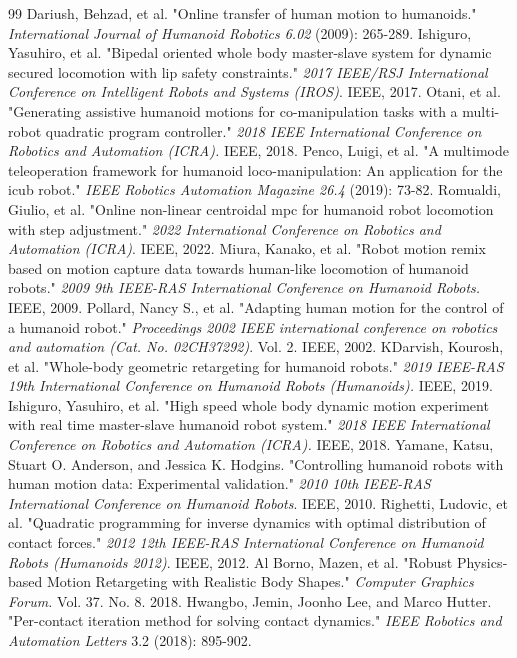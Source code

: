\begin{thebibliography}{99}
 Dariush, Behzad, et al. "Online transfer of human motion to humanoids." \textit{International Journal of Humanoid Robotics 6.02} (2009): 265-289.
Ishiguro, Yasuhiro, et al. "Bipedal oriented whole body master-slave system for dynamic secured locomotion with lip safety constraints." \textit{2017 IEEE/RSJ International Conference on Intelligent Robots and Systems (IROS)}. IEEE, 2017.
 Otani, et al. "Generating assistive humanoid motions for co-manipulation tasks with a multi-robot quadratic program controller." \textit{2018 IEEE International Conference on Robotics and Automation (ICRA).} IEEE, 2018.
 Penco, Luigi, et al. "A multimode teleoperation framework for humanoid loco-manipulation: An application for the icub robot." \textit{IEEE Robotics Automation Magazine 26.4 }(2019): 73-82.
 Romualdi, Giulio, et al. "Online non-linear centroidal mpc for humanoid robot locomotion with step adjustment." \textit{2022 International Conference on Robotics and Automation (ICRA)}. IEEE, 2022.
 Miura, Kanako, et al. "Robot motion remix based on motion capture data towards human-like locomotion of humanoid robots." \textit{2009 9th IEEE-RAS International Conference on Humanoid Robots. }IEEE, 2009. 
 Pollard, Nancy S., et al. "Adapting human motion for the control of a humanoid robot." \textit{Proceedings 2002 IEEE international conference on robotics and automation (Cat. No. 02CH37292)}. Vol. 2. IEEE, 2002.
 KDarvish, Kourosh, et al. "Whole-body geometric retargeting for humanoid robots." \textit{2019 IEEE-RAS 19th International Conference on Humanoid Robots (Humanoids). }IEEE, 2019.
 Ishiguro, Yasuhiro, et al. "High speed whole body dynamic motion experiment with real time master-slave humanoid robot system." \textit{2018 IEEE International Conference on Robotics and Automation (ICRA).} IEEE, 2018.
 Yamane, Katsu, Stuart O. Anderson, and Jessica K. Hodgins. "Controlling humanoid robots with human motion data: Experimental validation." \textit{2010 10th IEEE-RAS International Conference on Humanoid Robots}. IEEE, 2010.
 Righetti, Ludovic, et al. "Quadratic programming for inverse dynamics with optimal distribution of contact forces." \textit{2012 12th IEEE-RAS International Conference on Humanoid Robots (Humanoids 2012)}. IEEE, 2012.
 Al Borno, Mazen, et al. "Robust Physics‐based Motion Retargeting with Realistic Body Shapes." \textit{Computer Graphics Forum.} Vol. 37. No. 8. 2018.
 Hwangbo, Jemin, Joonho Lee, and Marco Hutter. "Per-contact iteration method for solving contact dynamics." \textit{IEEE Robotics and Automation Letters }3.2 (2018): 895-902.

\end{thebibliography}
